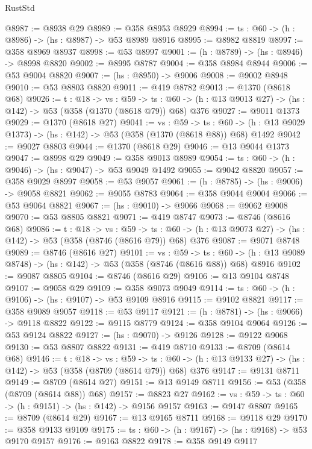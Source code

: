 \begin{lexlean}{RustStd}
\begin{coremodule}
@8987 := @8938 @29
@8989 := @358 @8953 @8929
@8994 := {ts : @60} -> (h : @8986) -> (hs : @8987) -> @53 @8989 @8916
@8995 := @8982 @8819
@8997 := @358 @8969 @8937
@8998 := @53 @8997
@9001 := (h : @8789) -> (hs : @8946) -> @8998 @8820
@9002 := @8995 @8787
@9004 := @358 @8984 @8944
@9006 := @53 @9004 @8820
@9007 := (hs : @8950) -> @9006
@9008 := @9002 @8948
@9010 := @53 @8803 @8820
@9011 := @419 @8782
@9013 := @1370 (@8618 @68)
@9026 := {t : @18} ->
  {vs : @59} ->
  {ts : @60} -> (h : @13 @9013 @27) -> (hs : @142) -> @53 (@358 (@1370 (@8618 @79)) @68) @376
@9027 := @9011 @1373
@9029 := @1370 (@8618 @27)
@9041 := {vs : @59} ->
  {ts : @60} -> (h : @13 @9029 @1373) -> (hs : @142) -> @53 (@358 (@1370 (@8618 @88)) @68) @1492
@9042 := @9027 @8803
@9044 := @1370 (@8618 @29)
@9046 := @13 @9044 @1373
@9047 := @8998 @29
@9049 := @358 @9013 @8989
@9054 := {ts : @60} -> (h : @9046) -> (hs : @9047) -> @53 @9049 @1492
@9055 := @9042 @8820
@9057 := @358 @9029 @8997
@9058 := @53 @9057
@9061 := (h : @8785) -> (hs : @9006) -> @9058 @8821
@9062 := @9055 @8783
@9064 := @358 @9044 @9004
@9066 := @53 @9064 @8821
@9067 := (hs : @9010) -> @9066
@9068 := @9062 @9008
@9070 := @53 @8805 @8821
@9071 := @419 @8747
@9073 := @8746 (@8616 @68)
@9086 := {t : @18} ->
  {vs : @59} ->
  {ts : @60} -> (h : @13 @9073 @27) -> (hs : @142) -> @53 (@358 (@8746 (@8616 @79)) @68) @376
@9087 := @9071 @8748
@9089 := @8746 (@8616 @27)
@9101 := {vs : @59} ->
  {ts : @60} -> (h : @13 @9089 @8748) -> (hs : @142) -> @53 (@358 (@8746 (@8616 @88)) @68) @8916
@9102 := @9087 @8805
@9104 := @8746 (@8616 @29)
@9106 := @13 @9104 @8748
@9107 := @9058 @29
@9109 := @358 @9073 @9049
@9114 := {ts : @60} -> (h : @9106) -> (hs : @9107) -> @53 @9109 @8916
@9115 := @9102 @8821
@9117 := @358 @9089 @9057
@9118 := @53 @9117
@9121 := (h : @8781) -> (hs : @9066) -> @9118 @8822
@9122 := @9115 @8779
@9124 := @358 @9104 @9064
@9126 := @53 @9124 @8822
@9127 := (hs : @9070) -> @9126
@9128 := @9122 @9068
@9130 := @53 @8807 @8822
@9131 := @419 @8710
@9133 := @8709 (@8614 @68)
@9146 := {t : @18} ->
  {vs : @59} ->
  {ts : @60} -> (h : @13 @9133 @27) -> (hs : @142) -> @53 (@358 (@8709 (@8614 @79)) @68) @376
@9147 := @9131 @8711
@9149 := @8709 (@8614 @27)
@9151 := @13 @9149 @8711
@9156 := @53 (@358 (@8709 (@8614 @88)) @68)
@9157 := @8823 @27
@9162 := {vs : @59} -> {ts : @60} -> (h : @9151) -> (hs : @142) -> @9156 @9157
@9163 := @9147 @8807
@9165 := @8709 (@8614 @29)
@9167 := @13 @9165 @8711
@9168 := @9118 @29
@9170 := @358 @9133 @9109
@9175 := {ts : @60} -> (h : @9167) -> (hs : @9168) -> @53 @9170 @9157
@9176 := @9163 @8822
@9178 := @358 @9149 @9117

\end{coremodule}
\end{lexlean}
